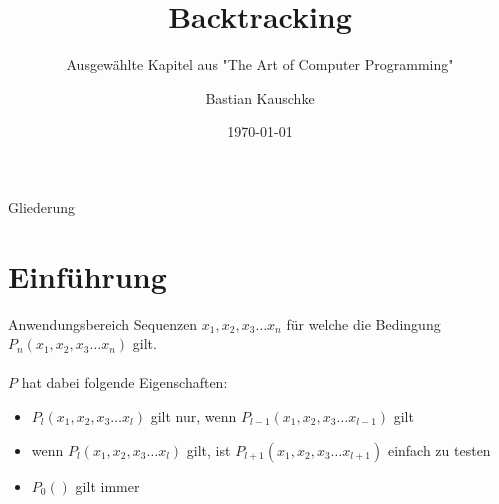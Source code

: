 \documentclass[aspectratio=43,t]{beamer}
\title[Backtracking]{Backtracking}
\subtitle{Ausgewählte Kapitel aus "The Art of Computer Programming"}
\author[Bastian Kauschke]{Bastian Kauschke}
\institute[Hardware-Software-Co-Design]{Hardware-Software-Co-Design, Friedrich-Alexander-Universität Erlangen-Nürnberg}
\date{\today}
\begin{document}
  \maketitle

  { %
    \begin{frame}[noframenumbering]{Gliederung}
      \tableofcontents
    \end{frame}
  }

  \section{Einführung}
  \begin{frame}{Anwendungsbereich}
    Sequenzen $x_{1}, x_{2}, x_{3} \dots x_{n}$ für welche die Bedingung $P_{n}(x_{1}, x_{2}, x_{3} \dots x_{n})$ gilt.\\
    \ \\ 
    $P$ hat dabei folgende Eigenschaften: \pause
    \begin{itemize}
      \item $P_{l}(x_{1}, x_{2}, x_{3} \dots x_{l})$ gilt nur, wenn $P_{l-1}(x_{1}, x_{2}, x_{3} \dots x_{l-1})$ gilt \pause
      \item wenn $P_{l}(x_{1}, x_{2}, x_{3} \dots x_{l})$ gilt, ist $P_{l+1}(x_{1}, x_{2}, x_{3} \dots x_{l+1})$ einfach zu testen \pause
      \item $P_{0}()$ gilt immer
    \end{itemize}
  \end{frame}
\end{document}
